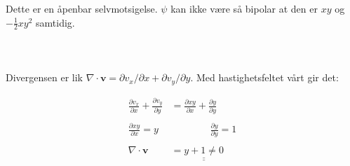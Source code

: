 Dette er en åpenbar selvmotsigelse. $\psi$ kan ikke være så bipolar at den
er $xy$ og $- \frac{1}{2} xy^2$ samtidig.
\\
\\
\\
\\

Divergensen er lik $\nabla \cdot \textbf{v} = \partial v_x /\partial x
+  \partial v_y /\partial y$. Med hastighetsfeltet vårt gir det:

\begin{align*}
    \frac{\partial v_x}{\partial x}
    +
    \frac{\partial v_y}{\partial y}
    &=
    \frac{\partial xy}{\partial x}
    +
    \frac{\partial y}{\partial y}
    \\
    \\
    \frac{\partial xy}{\partial x}
    =
    y
    &\qquad \qquad
    \frac{\partial y}{\partial y}
    =
    1
    \\
    \\
    \nabla \cdot \textbf{v} &= \underline{\underline{y + 1 \neq 0}}
    \\
    \\
\end{align*}






%
